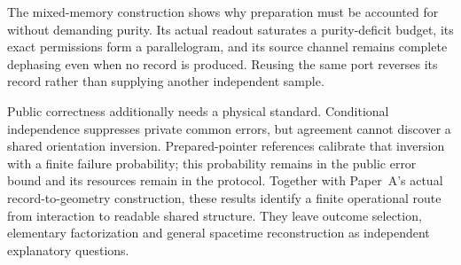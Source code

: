 \documentclass[12pt,a4paper]{article}
\begin{document}
The mixed-memory construction shows why preparation must be
accounted for without demanding purity. Its actual readout
saturates a purity-deficit budget, its exact permissions form
a parallelogram, and its source channel remains complete
dephasing even when no record is produced. Reusing the same
port reverses its record rather than supplying another
independent sample.

Public correctness additionally needs a physical standard.
Conditional independence suppresses private common errors,
but agreement cannot discover a shared orientation inversion.
Prepared-pointer references calibrate that inversion with a
finite failure probability; this probability remains in the
public error bound and its resources remain in the protocol.
Together with Paper~A's actual record-to-geometry construction,
these results identify a finite operational route from
interaction to readable shared structure. They leave outcome
selection, elementary factorization and general spacetime
reconstruction as independent explanatory questions.
\end{document}
